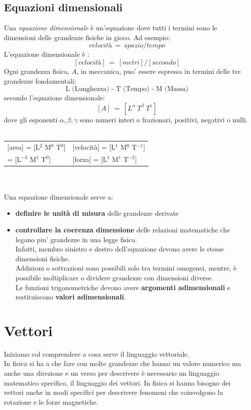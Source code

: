 \documentclass[12pt]{report}
\begin{document}
	\section{Equazioni dimensionali}
	Una \textit{equazione dimensionale} è  un'equazione dove tutti i termini sono le dimensioni delle grandezze fisiche in gioco. Ad esempio:
	\[
	velocità\ =\ spazio/tempo
	\]
	L'equazione dimensionale è :
	\[
	[velocità]\ =\ [metri]/[secondo]
	\]
	Ogni grandezza fisica, $A$, in meccanica, puo' essere espressa in termini delle tre grandezze fondamentali:
	\[
	\text{L (Lunghezza) - T (Tempo) - M (Massa)}
	\]
	secondo l'equazione dimensionale:
	\[
	[A]\ =\ [L^\alpha\ T^\beta\ T^\gamma]
	\]
	dove gli esponenti $\alpha, \beta, \gamma$ sono numeri interi o frazionari, positivi, negativi o nulli. \\ \quad \\
	\begin{tabular}{l@{\hspace{3cm}}l}
		[area] = [L$^2$ M$^0$ T$^0$] & [velocità] = [L$^1$ M$^0$ T$^{-1}$] \\[0.5cm]
		[densità] = [L$^{-3}$ M$^1$ T$^0$] & [forza] = [L$^1$ M$^1$ T$^{-2}$]
	\end{tabular} \\ \quad \\
	Una equazione dimensionale serve a:
	\begin{itemize}
		\item \textbf{definire le unità di misura} delle grandezze derivate
		\item \textbf{controllare la coerenza dimensione} delle relazioni matematiche che legano piu' grandezze in una legge fisica. \\
		Infatti, membro sinistro e destro dell'equazione devono avere le stesse dimensioni fisiche. \\
		Addizioni o sottrazioni sono possibili solo tra termini omogenei, mentre, è  possibile moltiplicare o dividere grandezze con dimensioni diverse. \\
		Le funzioni trigonometriche devono avere \textbf{argomenti adimensionali} e restituiscono \textbf{valori adimensionali}.
	\end{itemize}
	\chapter{Vettori}
	Iniziamo col comprendere a cosa serve il linguaggio vettoriale. \\
	In fisica si ha a che fare con molte grandezze che hanno un valore numerico ma anche una direzione e un verso per descrivere è  necessario un linguaggio matematico specifico, il linguaggio dei vettori. In fisica si hanno bisogno dei vettori anche in modi specifici per descrivere fenomeni che coinvolgono la rotazione e le forze magnetiche.
\end{document}
